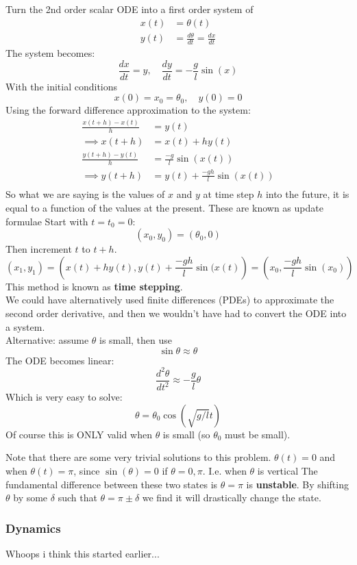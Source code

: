 \documentclass{/home/janmebows/Documents/LatexTemplates/myassignment}
\begin{document}
Turn the 2nd order scalar ODE into a first order system of
\begin{align*}
    x(t) &= \theta(t)\\
    y(t) &= \frac{d\theta}{dt} = \frac{dx}{dt}
\end{align*}
The system becomes:
\[\frac{dx}{dt} = y , \quad \frac{dy}{dt} = -\frac{g}{l}\sin(x)\]
With the initial conditions 
\[x(0) = x_0 =\theta_0, \quad y(0) = 0\]
Using the forward difference approximation to the system:
\begin{align*}
    \frac{x(t+h) - x(t)}{h} &= y(t)\\
    \implies x(t+h) &= x(t) +hy(t) \\
    \frac{y(t+h)-y(t)}{h} &= \frac{-g}{l} \sin(x(t))\\
    \implies y(t+h) &= y(t)+ \frac{-gh}{l} \sin(x(t))\\
\end{align*}
So what we are saying is the values of $x$ and $y$ at time step $h$ into the future, it is equal to a function of the values at the present. These are known as update formulae 
Start with $t=t_0=0$:
\[(x_0,y_0) = (\theta_0,0)\]
Then increment $t$ to $t+h$.
\[(x_1,y_1) = \left(x(t) + hy(t),y(t)+ \frac{-gh}{l} \sin(x(t)\right)= \left(x_0, \frac{-gh}{l} \sin(x_0)\right)\]
This method is known as \textbf{time stepping}.\\
We could have alternatively used finite differences (PDEs) to approximate the second order derivative, and then we wouldn't have had to convert the ODE into a system.\\
Alternative: assume $\theta$ is small, then use 
\[\sin\theta \approx \theta\]
The ODE becomes linear:
\[\frac{d^2\theta}{dt^2} \approx- \frac{g}{l} \theta\]
Which is very easy to solve:
\[\theta = \theta_0 \cos(\sqrt{g/l} t)\]
Of course this is ONLY valid when $\theta$ is small (so $\theta_0$ must be small).

Note that there are some very trivial solutions to this problem. $\theta(t) = 0$ and when $\theta(t) = \pi$, since $\sin(\theta) = 0$ if $\theta=0,\pi$. I.e. when $\theta$ is vertical  
The fundamental difference between these two states is $\theta=\pi$ is \textbf{unstable}. By shifting $\theta$ by some $\delta$ such that $\theta = \pi \pm \delta$ we find it will drastically change the state.

\subsubsection{Dynamics}
Whoops i think this started earlier...
\end{document}
